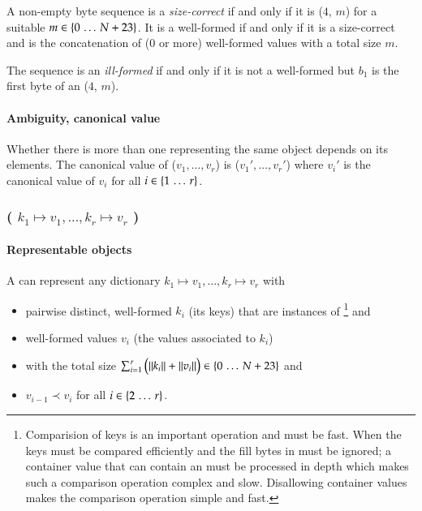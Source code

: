 A non-empty byte sequence  is a \emph{size-correct} \DborSequenceValue{}
if and only if it is
\DborIntegerToken*($4$, $m$) {\Concat}  for a suitable
$m \in \{0 \,\ldots\, N + 23\}$.
It is a well-formed \DborSequenceValue{} if and only if it is a size-correct \DborSequenceValue{} and
 is the concatenation of ($0$ or more)
well-formed values with a total size $m$.

The sequence is an \emph{ill-formed} \DborSequenceValue{} if and only if it is not a well-formed
\DborSequenceValue{} but $b_1$ is the first byte of an \DborIntegerToken*($4$, $m$).

\paragraph{Ambiguity, canonical value}

Whether there is more than one \DborSequenceValue{} representing the same object depends on its
elements.
The canonical value of \DborSequenceValue{}($v_1, \ldots, v_r$) is
\DborSequenceValue($v_1', \ldots, v_r'$)
where $v_i'$ is the canonical value of $v_i$ for all $i \in \{1 \,\ldots\, r\}$.


\subsubsection{\DborDictionaryValue(\texorpdfstring{%
    $k_1 \mapsto v_1, \ldots, k_r \mapsto v_r$%
}{%
    k1 -> v1, ..., kr -> vr%
})}
\hypertarget{sec:def:DictionaryValue}{}

\paragraph{Representable objects}

A \DborDictionaryValue{} can represent any dictionary $k_1 \mapsto v_1, \ldots, k_r \mapsto v_r$ with
\begin{itemize}
    \item
    pairwise distinct, well-formed $k_i$ (its keys) that are instances of \DborElementaryValue
    \footnote{
        Comparision of keys is an important operation and must be fast.
        When the keys must be compared efficiently and the fill bytes in \DborAllocatedValue*{} must be
        ignored; a container value that can contain an \DborAllocatedValue*{} must be processed in depth
        which makes such a comparison operation complex and slow.
        Disallowing container values makes the comparison operation simple and fast.
    }
    and

    \item
    well-formed values $v_i$ (the values associated to $k_i$)

    \item
    with the total size $\sum_{i = 1}^r \big(\|k_i\| + \|v_i\|\big) \in \{0 \,\ldots\, N + 23\}$ and

    \item
    $v_{i - 1} \prec v_{i}$ for all $i \in \{2 \,\ldots\, r\}$.
\end{itemize}

